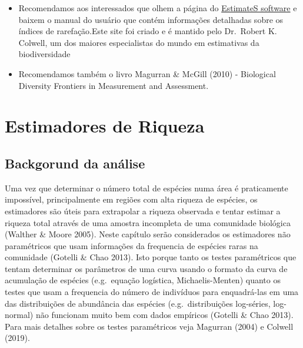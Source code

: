 \documentclass[
]{book}
\begin{document}
\begin{itemize}
\item
  Recomendamos aos interessados que olhem a página do \href{http://viceroy.eeb.uconn.edu/estimates}{EstimateS software} e baixem o manual do usuário que contém informações detalhadas sobre os índices de rarefação.Este site foi criado e é mantido pelo Dr.~Robert K. Colwell, um dos maiores especialistas do mundo em estimativas da biodiversidade
\item
  Recomendamos também o livro Magurran \& McGill (2010) - Biological Diversity Frontiers in Measurement and Assessment.
\end{itemize}

\hypertarget{estimadores-de-riqueza}{%
\chapter{Estimadores de Riqueza}\label{estimadores-de-riqueza}}

\hypertarget{backgorund-da-anuxe1lise}{%
\section{Backgorund da análise}\label{backgorund-da-anuxe1lise}}

Uma vez que determinar o número total de espécies numa área é praticamente impossível, principalmente em regiões com alta riqueza de espécies, os estimadores são úteis para extrapolar a riqueza observada e tentar estimar a riqueza total através de uma amostra incompleta de uma comunidade biológica (Walther \& Moore 2005). Neste capítulo serão considerados os estimadores não paramétricos que usam informações da frequencia de espécies raras na comunidade (Gotelli \& Chao 2013). Isto porque tanto os testes paramétricos que tentam determinar os parâmetros de uma curva usando o formato da curva de acumulação de espécies (e.g.~equação logística, Michaelis-Menten) quanto os testes que usam a frequencia do número de indivíduos para enquadrá-las em uma das distribuições de abundância das espécies (e.g.~distribuições log-séries, log-normal) não funcionam muito bem com dados empíricos (Gotelli \& Chao 2013). Para mais detalhes sobre os testes paramétricos veja Magurran (2004) e Colwell (2019).
\end{document}
